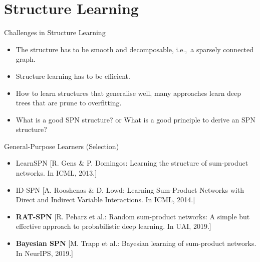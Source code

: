 \section{Structure Learning}

\begin{frame}{Challenges in Structure Learning}
\begin{itemize}
    \item The structure has to be smooth and decomposable, i.e.,~a sparsely connected graph.
    \item Structure learning has to be efficient.
    \item How to learn structures that generalise well, many approaches learn deep trees that are prune to overfitting.
    \item What is a good SPN structure? or What is a good principle to derive an SPN structure?
\end{itemize}
\end{frame}

\begin{frame}{General-Purpose Learners (Selection)}{}
\begin{itemize}
    \item LearnSPN {\scriptsize [R. Gens \& P. Domingos: Learning the structure of sum-product networks. In ICML, 2013.]}
    \item ID-SPN {\scriptsize [A. Rooshenas \& D. Lowd: Learning Sum-Product Networks with Direct and Indirect Variable Interactions. In ICML, 2014.]}
    \item \textbf{RAT-SPN} {\scriptsize [R. Peharz et al.: Random sum-product networks: A simple but effective approach to probabilistic deep learning. In UAI, 2019.]}
    \item \textbf{Bayesian SPN} {\scriptsize [M. Trapp et al.: Bayesian learning of sum-product networks. In NeurIPS, 2019.]}
\end{itemize}
\end{frame}


